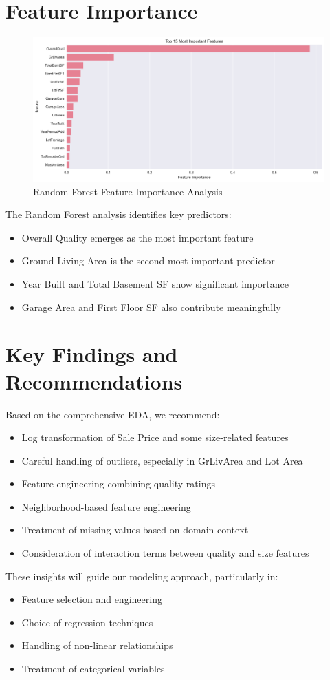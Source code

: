 \section{Feature Importance}
\begin{figure}[H]
    \centering
    \includegraphics[width=1.0\textwidth]{figures/feature_importance.png}
    \caption{Random Forest Feature Importance Analysis}
    \label{fig:feature_importance}
\end{figure}

The Random Forest analysis identifies key predictors:
\begin{itemize}
    \item Overall Quality emerges as the most important feature
    \item Ground Living Area is the second most important predictor
    \item Year Built and Total Basement SF show significant importance
    \item Garage Area and First Floor SF also contribute meaningfully
\end{itemize}

\section{Key Findings and Recommendations}
Based on the comprehensive EDA, we recommend:
\begin{itemize}
    \item Log transformation of Sale Price and some size-related features
    \item Careful handling of outliers, especially in GrLivArea and Lot Area
    \item Feature engineering combining quality ratings
    \item Neighborhood-based feature engineering
    \item Treatment of missing values based on domain context
    \item Consideration of interaction terms between quality and size features
\end{itemize}

These insights will guide our modeling approach, particularly in:
\begin{itemize}
    \item Feature selection and engineering
    \item Choice of regression techniques
    \item Handling of non-linear relationships
    \item Treatment of categorical variables
\end{itemize}